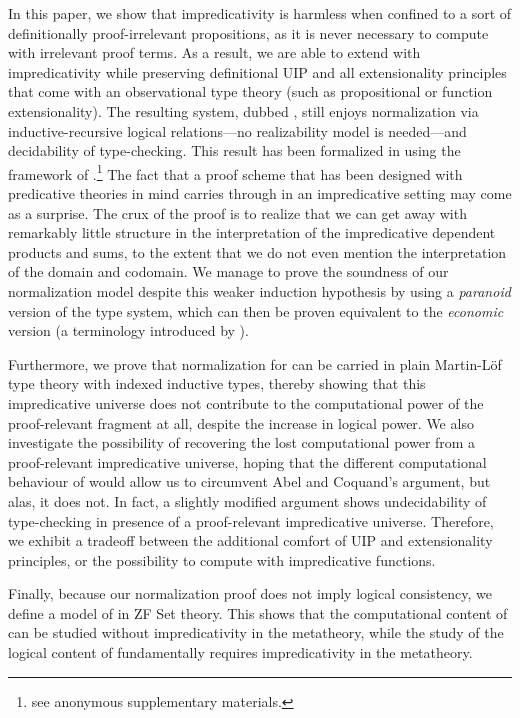 In this paper, we show that impredicativity is harmless when confined
to a sort of definitionally proof-irrelevant propositions, as it is never
necessary to compute with irrelevant proof terms.
%
As a result, we are able to extend \SetoidTT with impredicativity while
preserving definitional UIP and all extensionality principles that come
with an observational type theory (such as propositional or function
extensionality).
%
The resulting system, dubbed \SetoidCC, still enjoys
normalization via inductive-recursive logical relations---no
realizability model is needed---and decidability of type-checking.
%
This result has been formalized in \Agda using the framework of
.\footnote{see anonymous supplementary
  materials.}
%
The fact that a proof scheme that has been designed with predicative
theories in mind carries through in an impredicative setting
may come as a surprise.
%
The crux of the proof is to realize that we can get away with
remarkably little structure in the interpretation of the impredicative
dependent products and sums, to the extent that we do not even mention the
interpretation of the domain and codomain.
%
We manage to prove the soundness of our normalization model
despite this weaker induction hypothesis by using a \emph{paranoid}
version of the type system, which can then be proven equivalent to the
\emph{economic} version (a terminology introduced by
).

%
Furthermore, we prove that normalization for \SetoidCC can be
carried in plain Martin-Löf type theory with indexed inductive types,
thereby showing that this impredicative universe does not contribute
to the computational power of the proof-relevant fragment at all,
despite the increase in logical power.
%
We also investigate the possibility of recovering the lost computational power
from a proof-relevant impredicative universe, hoping that the different
computational behaviour of \SetoidCC would allow us to circumvent Abel and
Coquand's argument, but alas, it does not. In fact, a slightly modified
argument shows undecidability of type-checking in presence of a
proof-relevant impredicative universe.
%
Therefore, we exhibit a tradeoff between the additional comfort of
UIP and extensionality principles, or the possibility to compute with
impredicative functions.

Finally, because our normalization proof does not imply logical
consistency, we define a model of \SetoidCC in ZF Set
theory.
%
This shows that the computational content of \SetoidCC can be studied
without impredicativity in the metatheory, while the study of the
logical content of \SetoidCC fundamentally requires impredicativity in
the metatheory.

